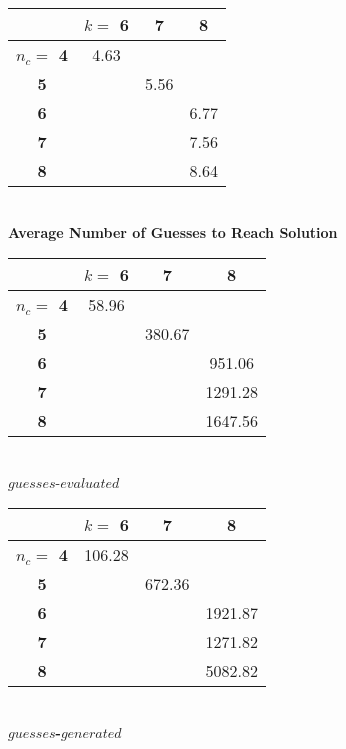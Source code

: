 \documentclass[11pt,twocolumn]{article}
\begin{document}
\begin{center}
\begin{tabular}{|c|c|c|c|}
\hline
        &\bf  $k= $ 6 &\bf 7 &\bf 8 \\
\hline
\bf $n_c = $ 4 & 4.63  &   &   \\
\hline
\bf 5       &       &5.56&   \\
\hline
\bf 6       &       &   &6.77 \\
\hline
\bf 7       &       &   &7.56\\
\hline
\bf 8       &       &   &8.64 \\
\hline
\end{tabular}\\
\bf Average Number of Guesses to Reach Solution \rm\\
\vspace{.7cm}

\begin{tabular}{|c|c|c|c|}
\hline
        &\bf $k= $ 6 &\bf 7 &\bf 8 \\
\hline
\bf $n_c = $ 4 & 58.96   &   &   \\
\hline
\bf 5       &       & 380.67  &   \\
\hline
\bf 6       &       &   & 951.06 \\
\hline
\bf 7       &       &   & 1291.28 \\
\hline
\bf 8       &       &   & 1647.56 \\
\hline
\end{tabular}\\
$guesses$-$evaluated$
\end{center}



\begin{center}
\begin{tabular}{|c|c|c|c|}
\hline
        &\bf $k= $ 6 &\bf 7 &\bf 8 \\
\hline
\bf $n_c = $ 4 & 106.28   &   &   \\
\hline
\bf 5       &       & 672.36&   \\
\hline
\bf 6       &       &   & 1921.87 \\
\hline
\bf 7       &       &   & 1271.82 \\
\hline
\bf 8       &       &   & 5082.82 \\
\hline
\end{tabular}\\
\bf $guesses$-$generated$ \rm
\end{center}
\end{document}
